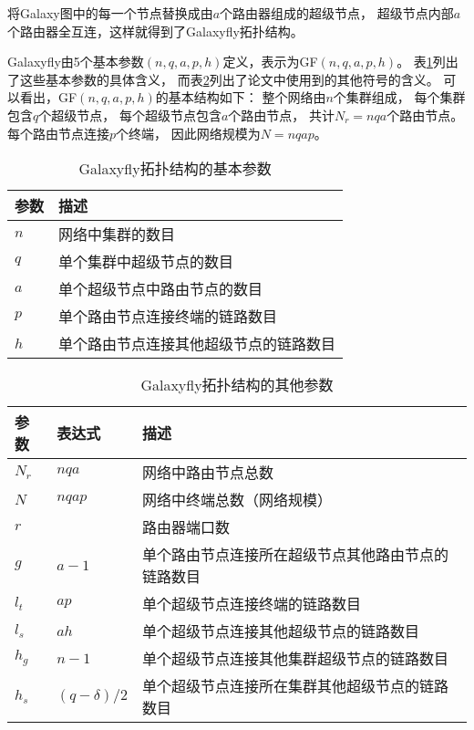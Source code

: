 将Galaxy图中的每一个节点替换成由$a$个路由器组成的超级节点，
超级节点内部$a$个路由器全互连，这样就得到了Galaxyfly拓扑结构。

Galaxyfly由5个基本参数$(n,q,a,p,h)$定义，表示为GF$(n,q,a,p,h)$。
表\ref{tab:gfparams}列出了这些基本参数的具体含义，
而表\ref{tab:gfderivedparams}列出了论文中使用到的其他符号的含义。
可以看出，GF$(n,q,a,p,h)$的基本结构如下：
整个网络由$n$个集群组成，
每个集群包含$q$个超级节点，
每个超级节点包含$a$个路由节点，
共计$N_r=nqa$个路由节点。
每个路由节点连接$p$个终端，
因此网络规模为$N=nqap$。

\begin{table}
  \centering
  \caption{Galaxyfly拓扑结构的基本参数}
  \label{tab:gfparams}
  \begin{tabular}{l l}
    \toprule
    参数 & 描述 \\
    \midrule
    $n$	& 网络中集群的数目\\
    $q$	& 单个集群中超级节点的数目\\
    $a$	& 单个超级节点中路由节点的数目\\
    $p$	& 单个路由节点连接终端的链路数目\\
    $h$ & 单个路由节点连接其他超级节点的链路数目\\
    \bottomrule
  \end{tabular}
\end{table}

\begin{table}
  \centering
  \caption{Galaxyfly拓扑结构的其他参数}
  \label{tab:gfderivedparams}
  \begin{tabular}{lll}
    \toprule
    参数 & 表达式   & 描述 \\
    \midrule
    $N_r$& $nqa$    & 网络中路由节点总数 \\
    $N$  & $nqap$   & 网络中终端总数（网络规模） \\
    $r$  &          & 路由器端口数\\
    $g$  & $a-1$    & 单个路由节点连接所在超级节点其他路由节点的链路数目\\
    $l_t$& $ap$     & 单个超级节点连接终端的链路数目\\
    $l_s$& $ah$     & 单个超级节点连接其他超级节点的链路数目\\
    $h_g$& $n-1$    & 单个超级节点连接其他集群超级节点的链路数目\\
    $h_s$& $(q-\delta)/2$ & 单个超级节点连接所在集群其他超级节点的链路数目\\
    \bottomrule
  \end{tabular}
\end{table}

